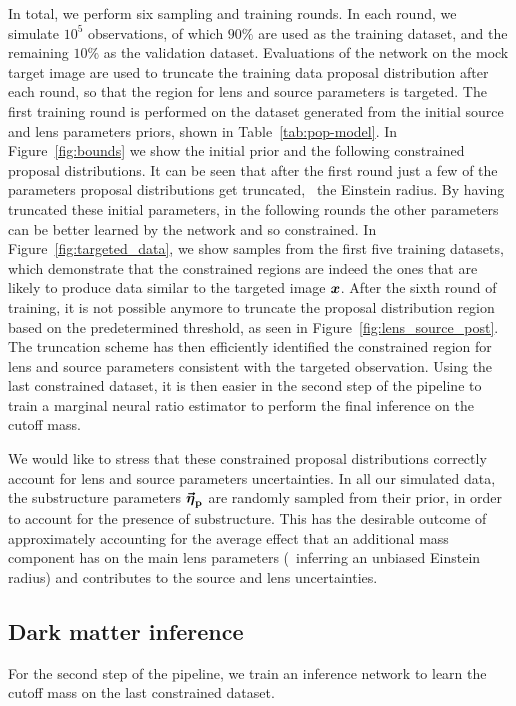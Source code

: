 In total, we perform six sampling and training rounds. In each round, we simulate $10^5$ observations, of which $90\%$ are used as the training dataset, and the remaining $10\%$ as the validation dataset. Evaluations of the network on the mock target image are used to truncate the  training data proposal distribution after each round, so that the region for lens and source parameters is targeted. The first training round is performed on the dataset generated from the initial source and lens parameters priors, shown in Table~\ref{tab:pop-model}. In Figure~\ref{fig:bounds} we show the initial prior and the following constrained proposal distributions. It can be seen that after the first round just a few of the parameters proposal distributions get truncated, \eg~the Einstein radius. By having truncated these initial parameters, in the following rounds the other parameters can be better learned by the network and so constrained. In Figure~\ref{fig:targeted_data}, we show samples from the first five training datasets, which demonstrate that the constrained regions are indeed the ones that are likely to produce data similar to the targeted image $\bm{x}$. After the sixth round of training, it is not possible anymore to truncate the proposal distribution region based on the predetermined threshold, as seen in Figure~\ref{fig:lens_source_post}. The truncation scheme has then efficiently identified the constrained region for lens and source parameters consistent with the targeted observation. Using the last constrained dataset, it is then easier in the second step of the pipeline to train a marginal neural ratio estimator to perform the final inference on the cutoff mass.

We would like to stress that these constrained proposal distributions correctly account for lens and source parameters uncertainties. In all our simulated data, the substructure parameters $\boldsymbol{\vec{{\bm{\eta}}}_\mathrm{p}}$ are randomly sampled from their prior, in order to account for the presence of substructure. This has the desirable outcome of approximately accounting for the average effect that an additional mass component has on the main lens parameters (\eg\ inferring an unbiased Einstein radius) and contributes to the source and lens uncertainties.

\subsection{Dark matter inference}
\label{subsec:dm}
For the second step of the pipeline, we train an inference network to learn the cutoff mass on the last constrained dataset. 

